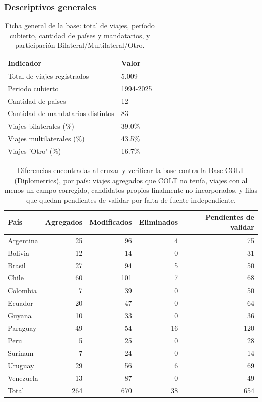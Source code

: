 \documentclass[11pt,a4paper]{article}
\begin{document}
\subsubsection{Descriptivos generales}

\begin{table}[ht]
\centering
\caption{Ficha general de la base: total de viajes, per\'iodo cubierto, cantidad de pa\'ises y mandatarios, y participaci\'on Bilateral/Multilateral/Otro.} 
\label{tab:ficha-general}
\begin{tabular}{ll}
  \hline
Indicador & Valor \\ 
  \hline
Total de viajes registrados & 5.009 \\ 
  Periodo cubierto & 1994-2025 \\ 
  Cantidad de paises & 12 \\ 
  Cantidad de mandatarios distintos & 83 \\ 
  Viajes bilaterales (\%) & 39.0\% \\ 
  Viajes multilaterales (\%) & 43.5\% \\ 
  Viajes 'Otro' (\%) & 16.7\% \\ 
   \hline
\end{tabular}
\end{table}
\begin{table}[ht]
\centering
\caption{Diferencias encontradas al cruzar y verificar la base contra la Base COLT (Diplometrics), por pa\'is: viajes agregados que COLT no ten\'ia, viajes con al menos un campo corregido, candidatos propios finalmente no incorporados, y filas que quedan pendientes de validar por falta de fuente independiente.} 
\label{tab:diferencias-colt}
\begin{tabular}{lrrrr}
  \hline
Pa\'is & Agregados & Modificados & Eliminados & Pendientes de validar \\ 
  \hline
Argentina &  25 &  96 &   4 &  75 \\ 
  Bolivia &  12 &  14 &   0 &  31 \\ 
  Brasil &  27 &  94 &   5 &  50 \\ 
  Chile &  60 & 101 &   7 &  68 \\ 
  Colombia &   7 &  39 &   0 &  50 \\ 
  Ecuador &  20 &  47 &   0 &  64 \\ 
  Guyana &  10 &  33 &   0 &  36 \\ 
  Paraguay &  49 &  54 &  16 & 120 \\ 
  Peru &   5 &  25 &   0 &  28 \\ 
  Surinam &   7 &  24 &   0 &  14 \\ 
  Uruguay &  29 &  56 &   6 &  69 \\ 
  Venezuela &  13 &  87 &   0 &  49 \\ 
   \hline
Total & 264 & 670 &  38 & 654 \\ 
   \hline
\end{tabular}
\end{table}
\end{document}
